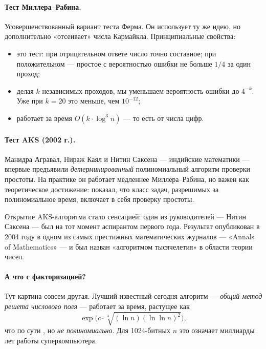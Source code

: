 \paragraph*{Тест Миллера--Рабина.} Усовершенствованный вариант теста Ферма. Он использует ту же идею, но дополнительно «отсеивает» числа Кармайкла. Принципиальные свойства:
\begin{itemize}
  \item это  тест: при отрицательном ответе число точно составное; при положительном --- простое с вероятностью ошибки не больше $1/4$ за один проход;
  \item делая $k$ независимых проходов, мы уменьшаем вероятность ошибки до $4^{-k}$. Уже при $k = 20$ это меньше, чем $10^{-12}$;
  \item работает за время $O(k\cdot \log^3 n)$ --- то есть  от числа цифр.
\end{itemize}

\paragraph*{Тест AKS (2002 г.).} Манидра Агравал, Нираж Каял и Нитин Саксена --- индийские математики --- впервые предъявили \emph{детерминированный} полиномиальный алгоритм проверки простоты. На практике он работает медленнее Миллера--Рабина, но важен как теоретическое достижение: показал, что класс задач, разрешимых за полиномиальное время, включает в себя проверку простоты.

\begin{interestbox}
Открытие AKS-алгоритма стало сенсацией: один из руководителей --- Нитин Саксена --- был на тот момент аспирантом первого года. Результат опубликован в 2004 году в одном из самых престижных математических журналов --- «Annals of Mathematics» --- и был назван «алгоритмом тысячелетия» в области теории чисел.
\end{interestbox}

\paragraph*{А что с факторизацией?} Тут картина совсем другая. Лучший известный сегодня алгоритм --- \emph{общий метод решета числового поля} --- работает за время, растущее как
\[
\exp\!\bigl(c\cdot \sqrt[3]{(\ln n)(\ln\ln n)^{2}}\bigr),
\]
что по сути , но \emph{не полиномиально}. Для 1024-битных $n$ это означает миллиарды лет работы суперкомпьютера.

